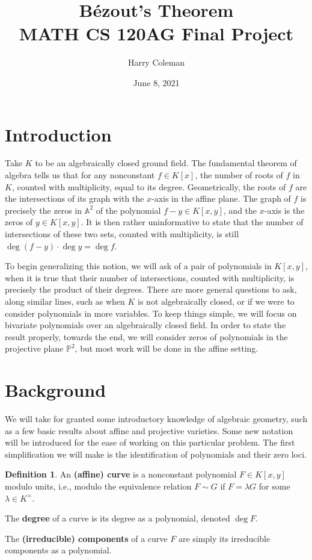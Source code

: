 \documentclass[12pt]{article}
\title{\vspace{-0.5in}B\'ezout's Theorem\\
    \large MATH CS 120AG Final Project
}
\author{Harry Coleman}
\date{June 8, 2021}
\newenvironment{fullbox}{\begin{lrbox}{\savefullbox}\begin{minipage}{\dimexpr\textwidth-2\fboxsep\relax}}{\end{minipage}\end{lrbox}\begin{center}\framebox[\textwidth]{\usebox{\savefullbox}}\end{center}}
\theoremstyle{definition}
\newtheorem{definition}[theorem]{Definition}
\newenvironment{bdefinition}{\begin{fullbox}\begin{definition}}{\end{definition}\end{fullbox}}
\newcommand{\<}{\langle}
\renewcommand{\>}{\rangle}
\newcommand{\A}{\mathbb{A}}
\renewcommand{\P}{\mathbb{P}}
\begin{document}
\maketitle

\section{Introduction}

Take $K$ to be an algebraically closed ground field. The fundamental theorem of algebra tells us that for any nonconstant $f \in K[x]$, the number of roots of $f$ in $K$, counted with multiplicity, equal to its degree. Geometrically, the roots of $f$ are the intersections of its graph with the $x$-axis in the affine plane. The graph of $f$ is precisely the zeros in $\A^2$ of the polynomial $f - y \in K[x, y]$, and the $x$-axis is the zeros of $y \in K[x, y]$. It is then rather uninformative to state that the number of intersections of these two sets, counted with multiplicity, is still $\deg(f - y) \cdot \deg y = \deg f$.

To begin generalizing this notion, we will ask of a pair of polynomials in $K[x, y]$, when it is true that their number of intersections, counted with multiplicity, is precisely the product of their degrees. There are more general questions to ask, along similar lines, such as when $K$ is not algebraically closed, or if we were to consider polynomials in more variables. To keep things simple, we will focus on bivariate polynomials over an algebraically closed field. In order to state the result properly, towards the end, we will consider zeros of polynomials in the projective plane $\P^2$, but most work will be done in the affine setting.

\section{Background}

We will take for granted some introductory knowledge of algebraic geometry, such as a few basic results about affine and projective varieties. Some new notation will be introduced for the ease of working on this particular problem. The first simplification we will make is the identification of polynomials and their zero loci.

\begin{bdefinition}
    An \textbf{(affine) curve} is a nonconstant polynomial $F \in K[x, y]$ modulo units, i.e., modulo the equivalence relation $F \sim G$ if $F = \lambda G$ for some $\lambda \in K^\times$. 

    The \textbf{degree} of a curve is its degree as a polynomial, denoted $\deg F$.
        
    The \textbf{(irreducible) components} of a curve $F$ are simply its irreducible components as a polynomial.
\end{bdefinition}
\end{document}
